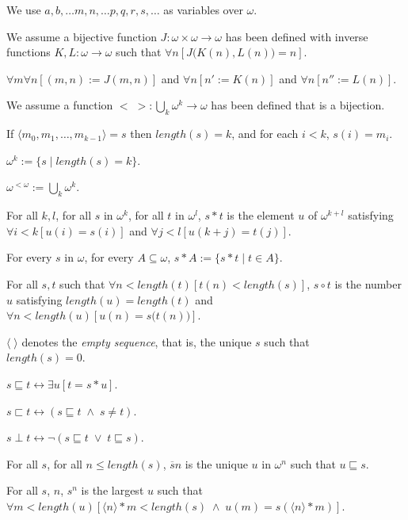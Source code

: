 \documentclass[a4paper]{amsart}
\theoremstyle{plain}
\begin{document}
 \smallskip We use $a, b, \ldots m,n, \ldots p,q,r,s, \ldots$ as variables over $\omega$.
 
 We assume a  bijective function $J:\omega\times\omega\rightarrow \omega$ has been defined with inverse functions $K,L:\omega\rightarrow\omega$ such that $\forall n[J\bigl(K(n), L(n)\bigr)=n]$.
 
 $\forall m\forall n[(m,n):=J(m,n)]$ and $\forall n[n':=K(n)]$ and $\forall n[n'':=L(n)]$. 
 
 \smallskip We assume a function $<\;>:\bigcup_k \omega^k \rightarrow \omega$ has been defined that is a bijection.
 
 If  $\langle m_0, m_1, \ldots,m_{k-1}\rangle =s$ then $length(s) =k$, and for each $i<k$, $s(i)=m_i$.
 
 
 

 $\omega^k:=\{s\mid length(s) = k\}$.

\smallskip $\omega^{<\omega}:=\bigcup_k \omega^k$.

\smallskip For all $k,l$, for all $s$ in $\omega^k$, for all $t$ in $\omega^l$, $s\ast t$ is the element $u$ of $\omega^{k+l}$ satisfying $\forall i<k[u(i)=s(i)]$ and $\forall j<l[u(k+j)=t(j)]$.

\smallskip
For every $s$ in $\omega$, for every  $A\subseteq\omega$, 
$s\ast A := \{s\ast t \mid t \in A\}.$

\smallskip For all $s,t$ such that $\forall n<length(t)[t(n)<length(s)]$, $s\circ t$ is the number $u$ satisfying $length(u)=length(t)$ and\\ $\forall n<length(u)[u(n)=s\bigl(t(n)\bigr)]$. 

\smallskip $\langle\;\rangle$ denotes the \textit{empty sequence}, that is, the unique $s$ such that \\$length(s)=0$.

\smallskip $s\sqsubseteq t\leftrightarrow \exists u[t=s\ast u]$.

\smallskip $s\sqsubset t\leftrightarrow (s\sqsubseteq t \;\wedge\; s\neq t)$. 

\smallskip $s\perp t\leftrightarrow \neg(s\sqsubseteq t \;\vee\; t\sqsubseteq s)$.

\smallskip
For all $s$, for all $n\le length(s)$, $\overline s n$ is the unique $u$ in $\omega^n$ such that $u\sqsubseteq s$.

\smallskip For all $s$, $n$, $s^n$ is the largest $u$ such that \\$\forall m<length(u)[\langle n \rangle\ast m<length(s) \;\wedge\; u(m)=s(\langle n \rangle \ast m)]$. 
\end{document}

